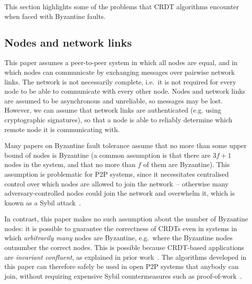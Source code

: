 \documentclass[sigplan,review]{acmart}
\begin{document}
This section highlights some of the problems that CRDT algorithms encounter when faced with Byzantine faults.

\subsection{Nodes and network links}\label{sec:system-model}

This paper assumes a peer-to-peer system in which all nodes are equal, and in which nodes can communicate by exchanging messages over pairwise network links.
The network is not necessarily complete, i.e.\ it is not required for every node to be able to communicate with every other node.
Nodes and network links are assumed to be asynchronous and unreliable, so messages may be lost.
However, we can assume that network links are authenticated (e.g. using cryptographic signatures), so that a node is able to reliably determine which remote node it is communicating with.

Many papers on Byzantine fault tolerance assume that no more than some upper bound of nodes is Byzantine (a common assumption is that there are $3f+1$ nodes in the system, and that no more than $f$ of them are Byzantine).
This assumption is problematic for P2P systems, since it necessitates centralised control over which nodes are allowed to join the network~-- otherwise many adversary-controlled nodes could join the network and overwhelm it, which is known as a Sybil attack~\cite{Douceur:2002}.

In contrast, this paper makes no such assumption about the number of Byzantine nodes: it is possible to guarantee the correctness of CRDTs even in systems in which \emph{arbitrarily many} nodes are Byzantine, e.g.\ where the Byzantine nodes outnumber the correct nodes.
This is possible because CRDT-based applications are \emph{invariant confluent}, as explained in prior work~\cite{BECPreprint}.
The algorithms developed in this paper can therefore safely be used in open P2P systems that anybody can join, without requiring expensive Sybil countermeasures such as proof-of-work~\cite{Nakamoto:2008}.
\end{document}

